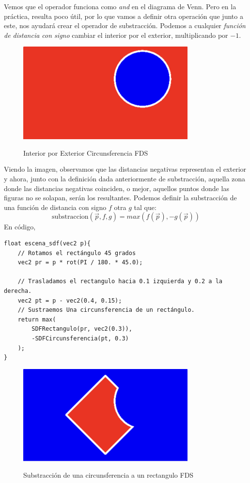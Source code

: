 Vemos que el operador funciona como \textit{and} en el diagrama de Venn. Pero en la práctica, resulta poco útil, por lo que vamos a definir otra operación que junto a este, nos ayudará crear el operador de substracción. Podemos a cualquier \textit{función de distancia con signo} cambiar el interior por el exterior, multiplicando por \(-1\).

\begin{figure}[H]
  \centering
  \captionsetup{justification=centering}%
  \includegraphics[width=0.8\textwidth]{secciones/imagenes/sdf_subtract-2.jpeg}\label{fig:negative}
  \caption{ Interior por Exterior Circunsferencia FDS}
\end{figure}

Viendo la imagen, observamos que las distancias negativas representan el exterior y ahora, junto con la definición dada anteriormente de substracción, aquella zona donde las distancias negativas coinciden, o mejor, aquellos puntos donde las figuras no se solapan, serán los resultantes. Podemos definir la substracción de una función de distancia con signo \(f\) otra \(g\) tal que:
\[\text{substraccion}(\Vec{p}, f,g)=max(f(\Vec{p}), -g(\Vec{p}))\]
En código,
\begin{lstlisting}
float escena_sdf(vec2 p){
    // Rotamos el rectángulo 45 grados
    vec2 pr = p * rot(PI / 180. * 45.0);
    
    // Trasladamos el rectangulo hacia 0.1 izquierda y 0.2 a la derecha.
    vec2 pt = p - vec2(0.4, 0.15);
    // Sustraemos Una circunsferencia de un rectángulo.
    return max(
        SDFRectangulo(pr, vec2(0.3)),
        -SDFCircunsferencia(pt, 0.3)
    );
}
\end{lstlisting}

\begin{figure}[H]
  \centering
  \captionsetup{justification=centering}%
  \includegraphics[width=0.8\textwidth]{secciones/imagenes/sdf_subtract-3.jpeg}\label{fig:substraction}
  \caption{Substracción de una circunsferencia a un rectangulo FDS}
\end{figure}

